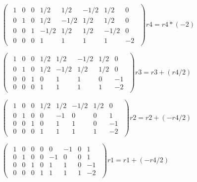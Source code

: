 \singlespacing

\begin{math}
    \begin{pmatrix}
        \begin{array}{cccc|cccc}
            1 & 0 & 0 & 1/2  & 1/2  & -1/2 & 1/2  & 0  \\
            0 & 1 & 0 & 1/2  & -1/2 & 1/2  & 1/2  & 0  \\
            0 & 0 & 1 & -1/2 & 1/2  & 1/2  & -1/2 & 0  \\
            0 & 0 & 0 & 1    & 1    & 1    & 1    & -2
        \end{array}
    \end{pmatrix}
    r4 = r4 * (-2)
\end{math}

\singlespacing

\begin{math}
    \begin{pmatrix}
        \begin{array}{cccc|cccc}
            1 & 0 & 0 & 1/2 & 1/2  & -1/2 & 1/2 & 0  \\
            0 & 1 & 0 & 1/2 & -1/2 & 1/2  & 1/2 & 0  \\
            0 & 0 & 1 & 0   & 1    & 1    & 0   & -1 \\
            0 & 0 & 0 & 1   & 1    & 1    & 1   & -2
        \end{array}
    \end{pmatrix}
    r3 = r3 + (r4/2)
\end{math}

\singlespacing

\begin{math}
    \begin{pmatrix}
        \begin{array}{cccc|cccc}
            1 & 0 & 0 & 1/2 & 1/2 & -1/2 & 1/2 & 0  \\
            0 & 1 & 0 & 0   & -1  & 0    & 0   & 1  \\
            0 & 0 & 1 & 0   & 1   & 1    & 0   & -1 \\
            0 & 0 & 0 & 1   & 1   & 1    & 1   & -2
        \end{array}
    \end{pmatrix}
    r2 = r2 + (-r4/2)
\end{math}

\singlespacing

\begin{math}
    \begin{pmatrix}
        \begin{array}{cccc|cccc}
            1 & 0 & 0 & 0 & 0  & -1 & 0 & 1  \\
            0 & 1 & 0 & 0 & -1 & 0  & 0 & 1  \\
            0 & 0 & 1 & 0 & 1  & 1  & 0 & -1 \\
            0 & 0 & 0 & 1 & 1  & 1  & 1 & -2
        \end{array}
    \end{pmatrix}
    r1 = r1 + (-r4/2)
\end{math}

